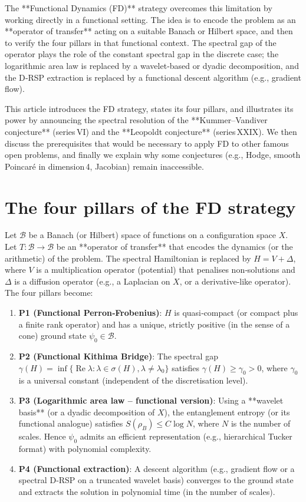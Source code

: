 \documentclass[11pt,a4paper]{article}
\begin{document}
The **Functional Dynamics (FD)** strategy overcomes this limitation by working directly in a functional setting. The idea is to encode the problem as an **operator of transfer** acting on a suitable Banach or Hilbert space, and then to verify the four pillars in that functional context. The spectral gap of the operator plays the role of the constant spectral gap in the discrete case; the logarithmic area law is replaced by a wavelet‑based or dyadic decomposition, and the D‑RSP extraction is replaced by a functional descent algorithm (e.g., gradient flow).

This article introduces the FD strategy, states its four pillars, and illustrates its power by announcing the spectral resolution of the **Kummer–Vandiver conjecture** (series VI) and the **Leopoldt conjecture** (series XXIX). We then discuss the prerequisites that would be necessary to apply FD to other famous open problems, and finally we explain why some conjectures (e.g., Hodge, smooth Poincaré in dimension 4, Jacobian) remain inaccessible.

\section{The four pillars of the FD strategy}

Let $\mathcal{B}$ be a Banach (or Hilbert) space of functions on a configuration space $X$. Let $T: \mathcal{B} \to \mathcal{B}$ be an **operator of transfer** that encodes the dynamics (or the arithmetic) of the problem. The spectral Hamiltonian is replaced by $H = V + \Delta$, where $V$ is a multiplication operator (potential) that penalises non‑solutions and $\Delta$ is a diffusion operator (e.g., a Laplacian on $X$, or a derivative‑like operator). The four pillars become:

\begin{enumerate}
\item \textbf{P1 (Functional Perron‑Frobenius)}: $H$ is quasi‑compact (or compact plus a finite rank operator) and has a unique, strictly positive (in the sense of a cone) ground state $\psi_0 \in \mathcal{B}$.
\item \textbf{P2 (Functional Kithima Bridge)}: The spectral gap $\gamma(H) = \inf\{ \operatorname{Re}\lambda : \lambda \in \sigma(H), \lambda \neq \lambda_0 \}$ satisfies $\gamma(H) \ge \gamma_0 > 0$, where $\gamma_0$ is a universal constant (independent of the discretisation level).
\item \textbf{P3 (Logarithmic area law – functional version)}: Using a **wavelet basis** (or a dyadic decomposition of $X$), the entanglement entropy (or its functional analogue) satisfies $S(\rho_B) \le C \log N$, where $N$ is the number of scales. Hence $\psi_0$ admits an efficient representation (e.g., hierarchical Tucker format) with polynomial complexity.
\item \textbf{P4 (Functional extraction)}: A descent algorithm (e.g., gradient flow or a spectral D‑RSP on a truncated wavelet basis) converges to the ground state and extracts the solution in polynomial time (in the number of scales).
\end{enumerate}
\end{document}
